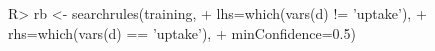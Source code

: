 \begin{Schunk}
% --begin: "pbld4"
\begin{Sinput}
R> rb <- searchrules(training,
+                    lhs=which(vars(d) != 'uptake'),
+                    rhs=which(vars(d) == 'uptake'),
+                    minConfidence=0.5)
\end{Sinput}
%
% --end: "pbld4"
\end{Schunk}
